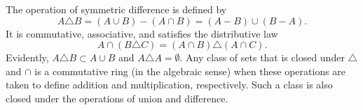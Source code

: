 The operation of symmetric difference is defined by
$$A \triangle B = (A \cup B) - (A \cap B) = (A - B) \cup (B - A).$$
It is commutative, associative, and satisfies the distributive law
$$A \cap (B \triangle C) = (A \cap B) \triangle (A \cap C).$$
Evidently, $A \triangle B \subset A \cup B$ and $A \triangle A = \emptyset$. Any class of sets that is closed under $\triangle$ and $\cap$ is a commutative ring (in the algebraic sense) when these operations are taken to define addition and multiplication, respectively. Such a class is also closed under the operations of union and difference.
